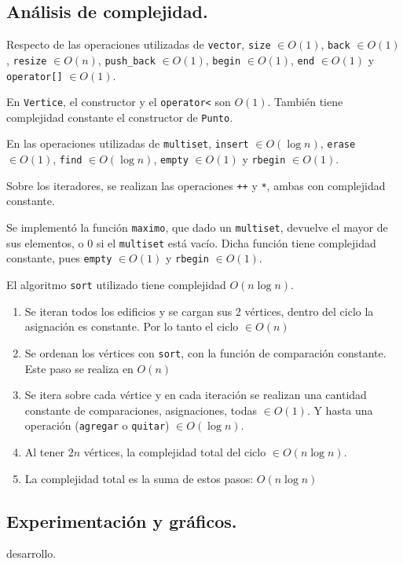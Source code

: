 \subsection{Análisis de complejidad.}

\vspace*{0.3cm}

Respecto de las operaciones utilizadas de \verb|vector|, \verb|size| $\in O(1)$,
\verb|back| $\in O(1)$, \verb|resize| $\in O(n)$, \verb|push_back| $\in O(1)$,
\verb|begin| $\in O(1)$, \verb|end| $\in O(1)$ y \verb|operator[]| $\in O(1)$.

\noindent
En \verb|Vertice|, el constructor y el \verb|operator<| son $O(1)$. También
tiene complejidad constante el constructor de \verb|Punto|.

\noindent
En las operaciones utilizadas de \verb|multiset|, \verb|insert| $\in O(\log n)$,
\verb|erase| $\in O(1)$, \verb|find| $\in O(\log n)$, \verb|empty| $\in O(1)$ y
\verb|rbegin| $\in O(1)$.

\noindent
Sobre los iteradores, se realizan las operaciones \verb|++| y \verb|*|, ambas
con complejidad constante.

\noindent
Se implementó la función \verb|maximo|, que dado un \verb|multiset|, devuelve
el mayor de sus elementos, o 0 si el \verb|multiset| está vacío. Dicha función
tiene complejidad constante, pues \verb|empty| $\in O(1)$ y \verb|rbegin| $\in O(1)$.

\noindent
El algoritmo \verb|sort| utilizado tiene complejidad $O(n \log n)$.

\noindent

\begin{enumerate}
  \item Se iteran todos los edificios y se cargan sus 2 vértices, dentro
  del ciclo la asignación es constante. Por lo tanto el ciclo $\in O(n)$

  \item Se ordenan los vértices con \verb|sort|, con la función de comparación
  constante. Este paso se realiza en $O(n)$

  \item Se itera sobre cada vértice y en cada iteración se realizan una cantidad
  constante de comparaciones, asignaciones, todas $\in O(1)$. Y hasta una operación
  (\verb|agregar| o \verb|quitar|) $\in O(\log n)$.

  \item Al tener $2n$ vértices, la complejidad total del ciclo $\in O(n \log n)$.

  \item La complejidad total es la suma de estos pasos: $O(n \log n)$
\end{enumerate}



\subsection{Experimentación y gráficos.}

\vspace*{0.3cm}

desarrollo.
